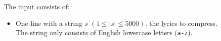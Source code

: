 
    The input consists of:
    \begin{itemize}
        \item One line with a string $s$ $(1 \leq |s| \leq 5000)$,
        the lyrics to compress. \\
        The string only consists of English lowercase letters (\texttt{a-z}).
    \end{itemize}
